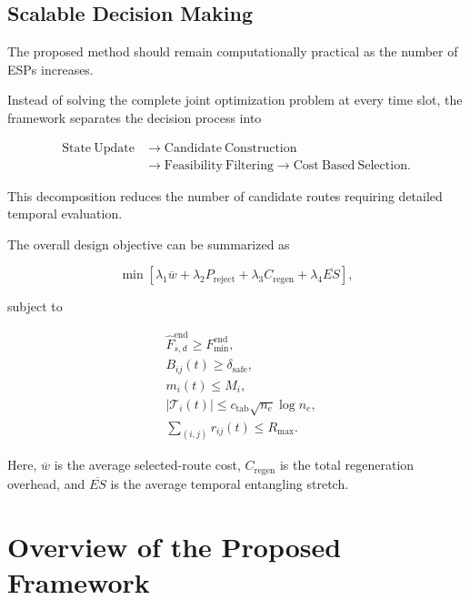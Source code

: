 \subsection{Scalable Decision Making}

The proposed method should remain computationally practical as the number of ESPs increases.

Instead of solving the complete joint optimization problem at every time slot, the framework separates the decision process into

\begin{equation}
\begin{aligned}
    \mathrm{State\ Update}
    &\rightarrow
    \mathrm{Candidate\ Construction}
    \\
    &\rightarrow
    \mathrm{Feasibility\ Filtering}
    \rightarrow
    \mathrm{Cost\ Based\ Selection}.
\end{aligned}
\end{equation}

This decomposition reduces the number of candidate routes requiring detailed temporal evaluation.

The overall design objective can be summarized as

\begin{equation}
    \min
    \left[
    \lambda_1
    \overline{w}
    +
    \lambda_2
    P_{\mathrm{reject}}
    +
    \lambda_3
    C_{\mathrm{regen}}
    +
    \lambda_4
    \overline{ES}
    \right],
\end{equation}

subject to

\begin{align}
    & \widehat{F}_{s,d}^{\mathrm{end}}
    \geq
    F_{\min}^{\mathrm{end}},\\
    & B_{ij}(t)
    \geq
    \delta_{\mathrm{safe}},\\
    & m_i(t)
    \leq
    M_i,\\
    & |\mathcal{T}_i(t)|
    \leq
    c_{\mathrm{tab}}
    \sqrt{n_e}\log n_e,\\
    & \sum_{(i,j)}r_{ij}(t)
    \leq
    R_{\max}.
\end{align}

Here, $\overline{w}$ is the average selected-route cost, $C_{\mathrm{regen}}$ is the total regeneration overhead, and $\overline{ES}$ is the average temporal entangling stretch.
\section{Overview of the Proposed Framework}

